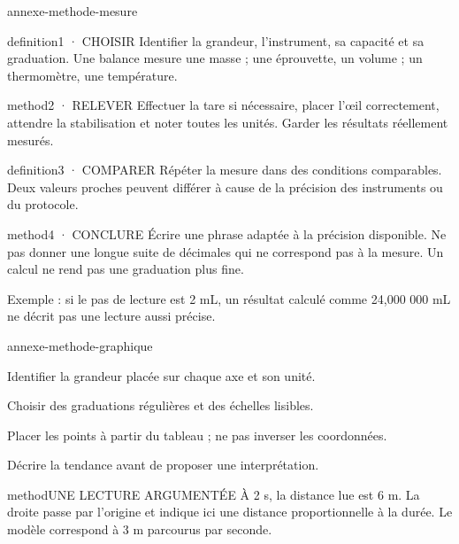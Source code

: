 \documentclass[12pt,twoside,openany]{book}
\begin{document}
\begin{pcFiche}{annexe-methode-mesure}
\begin{pcEncadre}{definition}{1 · CHOISIR}
Identifier la grandeur, l’instrument, sa capacité et sa graduation. Une balance mesure une masse ; une éprouvette, un volume ; un thermomètre, une température.\par
\end{pcEncadre}
\begin{pcEncadre}{method}{2 · RELEVER}
Effectuer la tare si nécessaire, placer l’œil correctement, attendre la stabilisation et noter toutes les unités. Garder les résultats réellement mesurés.\par
\end{pcEncadre}
\begin{pcEncadre}{definition}{3 · COMPARER}
Répéter la mesure dans des conditions comparables. Deux valeurs proches peuvent différer à cause de la précision des instruments ou du protocole.\par
\end{pcEncadre}
\begin{pcEncadre}{method}{4 · CONCLURE}
Écrire une phrase adaptée à la précision disponible. Ne pas donner une longue suite de décimales qui ne correspond pas à la mesure. Un calcul ne rend pas une graduation plus fine.\par
\end{pcEncadre}
Exemple : si le pas de lecture est 2 mL, un résultat calculé comme 24,000 000 mL ne décrit pas une lecture aussi précise.\par
\end{pcFiche}
\label{methode-graphique}
\begin{pcFiche}{annexe-methode-graphique}
\begin{questions}
\item Identifier la grandeur placée sur chaque axe et son unité.
\item Choisir des graduations régulières et des échelles lisibles.
\item Placer les points à partir du tableau ; ne pas inverser les coordonnées.
\item Décrire la tendance avant de proposer une interprétation.
\end{questions}
\begin{pcEncadre}{method}{UNE LECTURE ARGUMENTÉE}
À 2 s, la distance lue est 6 m. La droite passe par l’origine et indique ici une distance proportionnelle à la durée. Le modèle correspond à 3 m parcourus par seconde.\par
\end{pcEncadre}
\end{pcFiche}
\end{document}
